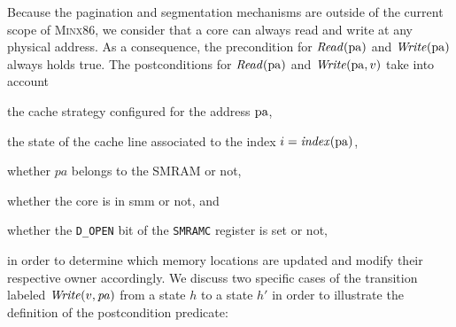 Because the pagination and segmentation mechanisms are outside of the current
scope of {\scshape Minx86}, we consider that a core can always read and write at
any physical address.
%
As a consequence, the precondition for \( \mathit{Read}(\mathrm{pa}) \) and
\( \mathit{Write}(\mathrm{pa}) \) always holds true.
%
The postconditions for \( \mathit{Read}(\mathrm{pa}) \) and
\( \mathit{Write}(\mathrm{pa}, v) \) take into account
%
\begin{inparaenum}[(1)]
\item the cache strategy configured for the address \( \mathrm{pa} \),
\item the state of the cache line associated to the index
  \( i = \mathit{index}(\mathrm{pa}) \),
\item whether \( pa \) belongs to the SMRAM or not,
\item whether the core is in \ac{smm} or not, and
\item whether the \texttt{D\_OPEN} bit of the \texttt{SMRAMC} register is set or
  not,
\end{inparaenum}
%
in order to determine which memory locations are updated and modify their
respective owner accordingly.
%
We discuss two specific cases of the transition labeled
\( \mathit{Write}(v, \mathit{pa}) \) from a state \( h \) to a state \( h' \) in
order to illustrate the definition of the postcondition predicate:
%
